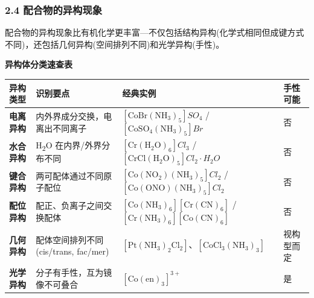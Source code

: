 \documentclass[a4paper,11pt]{ctexart}
\newcounter{none}
\newcommand{\箭}{\ensuremath{\rightarrow}}
\newcommand{\左箭}{\ensuremath{\leftarrow}}
\newcommand{\上箭}{\ensuremath{\uparrow}}
\newcommand{\下箭}{\ensuremath{\downarrow}}
\newcommand{\衡}{\ensuremath{\rightleftharpoons}}
\newcommand{\双箭}{\ensuremath{\leftrightarrow}}
\newcommand{\约等于}{\ensuremath{\approx}}
\newcommand{\小于等于}{\ensuremath{\leq}}
\newcommand{\大于等于}{\ensuremath{\geq}}
\newcommand{\不等于}{\ensuremath{\neq}}
\newcommand{\西格马}{\ensuremath{\sigma}}
\newcommand{\派}{\ensuremath{\pi}}
\begin{document}
\subsubsection{2.4 配合物的异构现象}\label{ux914dux5408ux7269ux7684ux5f02ux6784ux73b0ux8c61}

配合物的异构现象比有机化学更丰富---不仅包括结构异构(化学式相同但成键方式不同)，还包括几何异构(空间排列不同)和光学异构(手性)。

\textbf{异构体分类速查表}

{\def\LTcaptype{none} %
\begin{longtable}[]{@{}
  >{\raggedright\arraybackslash}p{}
  >{\raggedright\arraybackslash}p{}
  >{\raggedright\arraybackslash}p{}
  >{\centering\arraybackslash}p{}@{}}
\toprule\noalign{}
\begin{minipage}[b]{\linewidth}\raggedright
异构类型
\end{minipage} & \begin{minipage}[b]{\linewidth}\raggedright
识别要点
\end{minipage} & \begin{minipage}[b]{\linewidth}\raggedright
经典实例
\end{minipage} & \begin{minipage}[b]{\linewidth}\centering
手性可能
\end{minipage} \\
\midrule\noalign{}
\endhead
\bottomrule\noalign{}
\endlastfoot
\textbf{电离异构} & 内外界成分交换，电离出不同离子 & \([\mathrm{CoBr(NH_3)_5}]SO_4\) / \([\mathrm{CoSO_4(NH_3)_5}]Br\) & 否 \\
\textbf{水合异构} & H\textsubscript{2}O 在内界/外界分布不同 & \([\mathrm{Cr(H_2O)_6}]Cl_3\) / \([\mathrm{CrCl(H_2O)_5}]Cl_2\cdot H_2O\) & 否 \\
\textbf{键合异构} & 两可配体通过不同原子配位 & \([\mathrm{Co(NO_2)(NH_3)_5}]Cl_2\) / \([\mathrm{Co(ONO)(NH_3)_5}]Cl_2\) & 否 \\
\textbf{配位异构} & 配正、负离子之间交换配体 & \([\mathrm{Co(NH_3)_6}][\mathrm{Cr(CN)_6}]\) / \([\mathrm{Cr(NH_3)_6}][\mathrm{Co(CN)_6}]\) & 否 \\
\textbf{几何异构} & 配体空间排列不同(cis/trans, fac/mer) & \([\mathrm{Pt(NH_3)_2Cl_2}]\)、\([\mathrm{CoCl_3(NH_3)_3}]\) & 视构型而定 \\
\textbf{光学异构} & 分子有手性，互为镜像不可叠合 & \([\mathrm{Co(en)_3}]^{3+}\) & 是 \\
\end{longtable}
}
\end{document}
